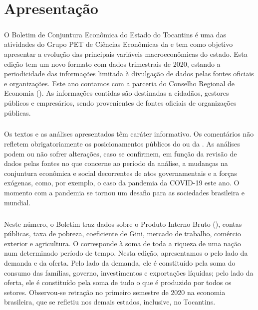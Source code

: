 \chapter*{Apresentação}
\begin{center}
	\begin{minipage}[t]{.7\linewidth}
		\paragraph{} O Boletim de Conjuntura Econômica do Estado do Tocantins é uma das atividades do Grupo PET de Ciências Econômicas da  e tem como objetivo apresentar a evolução das principais variáveis macroeconômicas do estado. Esta edição tem um novo formato com dados trimestrais de 2020, estando a periodicidade das informações limitada à divulgação de dados pelas fontes oficiais e organizações. Este ano contamos com a parceria do Conselho Regional de Economia (). As informações contidas são destinadas a cidadãos, gestores públicos e empresários, sendo provenientes de fontes oficiais de organizações públicas.

		\paragraph{} Os textos e as análises apresentados têm caráter   informativo. Os comentários não refletem obrigatoriamente os posicionamentos públicos do  ou da . As análises podem ou não sofrer alterações, caso se confirmem, em função da revisão de dados pelas fontes no que concerne ao período da análise, a mudanças na conjuntura econômica e social decorrentes de atos governamentais e a forças exógenas, como, por exemplo, o caso da pandemia da COVID-19 este ano. O momento com a pandemia se tornou um desafio para as sociedades brasileira e mundial.

		\paragraph{} Neste número, o Boletim traz dados sobre o Produto Interno Bruto (), contas públicas, taxa de pobreza, coeficiente de Gini, mercado de trabalho, comércio exterior e agricultura. O  corresponde à soma de toda a riqueza de uma nação num determinado período de tempo. Nesta edição, apresentamos o  pelo lado da demanda e da oferta. Pelo lado da demanda, ele é constituído pela soma do consumo das famílias, governo, investimentos e exportações líquidas; pelo lado da oferta, ele é constituído pela soma de tudo o que é produzido por todos os setores. Observou-se retração no primeiro semestre de 2020 na economia brasileira, que se refletiu nos demais estados, inclusive, no Tocantins.


\end{minipage}
\end{center}
